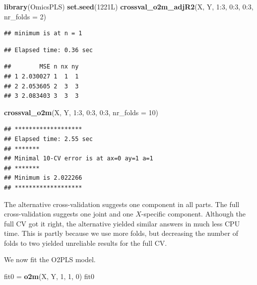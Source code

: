 \documentclass[]{article}
\newenvironment{Shaded}{\begin{snugshade}}{\end{snugshade}}
\newcommand{\KeywordTok}[1]{\textcolor[rgb]{0.13,0.29,0.53}{\textbf{{#1}}}}
\newcommand{\DataTypeTok}[1]{\textcolor[rgb]{0.13,0.29,0.53}{{#1}}}
\newcommand{\DecValTok}[1]{\textcolor[rgb]{0.00,0.00,0.81}{{#1}}}
\newcommand{\StringTok}[1]{\textcolor[rgb]{0.31,0.60,0.02}{{#1}}}
\newcommand{\NormalTok}[1]{{#1}}
\begin{document}
\begin{Shaded}
\begin{Highlighting}[]
\KeywordTok{library}\NormalTok{(OmicsPLS)}
\KeywordTok{set.seed}\NormalTok{(1221L)}
\KeywordTok{crossval_o2m_adjR2}\NormalTok{(X, Y, }\DecValTok{1}\NormalTok{:}\DecValTok{3}\NormalTok{, }\DecValTok{0}\NormalTok{:}\DecValTok{3}\NormalTok{, }\DecValTok{0}\NormalTok{:}\DecValTok{3}\NormalTok{, }\DataTypeTok{nr_folds =} \DecValTok{2}\NormalTok{)}
\end{Highlighting}
\end{Shaded}

\begin{verbatim}
## minimum is at n = 1
\end{verbatim}

\begin{verbatim}
## Elapsed time: 0.36 sec
\end{verbatim}

\begin{verbatim}
##        MSE n nx ny
## 1 2.030027 1  1  1
## 2 2.053605 2  3  3
## 3 2.083403 3  3  3
\end{verbatim}

\begin{Shaded}
\begin{Highlighting}[]
\KeywordTok{crossval_o2m}\NormalTok{(X, Y, }\DecValTok{1}\NormalTok{:}\DecValTok{3}\NormalTok{, }\DecValTok{0}\NormalTok{:}\DecValTok{3}\NormalTok{, }\DecValTok{0}\NormalTok{:}\DecValTok{3}\NormalTok{, }\DataTypeTok{nr_folds =} \DecValTok{10}\NormalTok{)}
\end{Highlighting}
\end{Shaded}

\begin{verbatim}
## *******************
## Elapsed time: 2.55 sec
## *******
## Minimal 10-CV error is at ax=0 ay=1 a=1 
## *******
## Minimum is 2.022266 
## *******************
\end{verbatim}

The alternative cross-validation suggests one component in all parts.
The full cross-validation suggests one joint and one \(X\)-specific
component. Although the full CV got it right, the alternative yielded
similar answers in much less CPU time. This is partly because we use
more folds, but decreasing the number of folds to two yielded unreliable
results for the full CV.

We now fit the O2PLS model.

\begin{Shaded}
\begin{Highlighting}[]
\NormalTok{fit0 =}\StringTok{ }\KeywordTok{o2m}\NormalTok{(X, Y, }\DecValTok{1}\NormalTok{, }\DecValTok{1}\NormalTok{, }\DecValTok{0}\NormalTok{)}
\NormalTok{fit0}
\end{Highlighting}
\end{Shaded}
\end{document}
